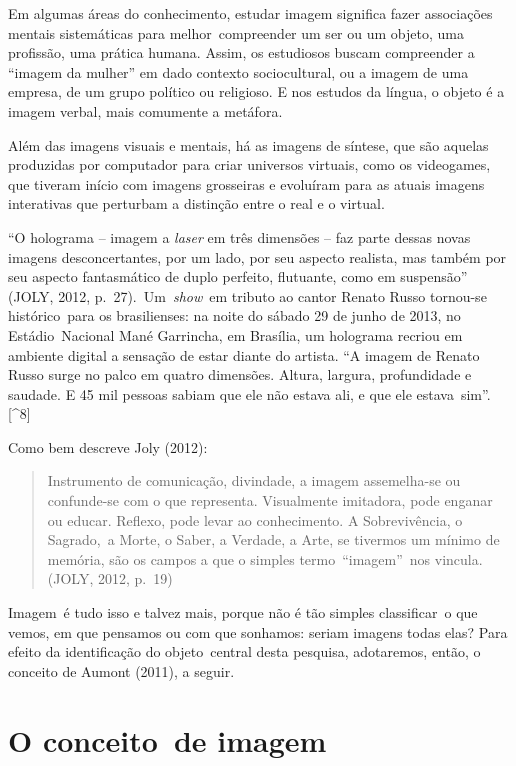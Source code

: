 \documentclass[
  letterpaper,
]{abntex2}
\begin{document}
Em algumas áreas do conhecimento, estudar imagem significa fazer
associações mentais sistemáticas para melhor~compreender um ser ou um
objeto, uma profissão, uma prática humana. Assim, os estudiosos buscam
compreender a ``imagem da mulher'' em dado contexto sociocultural, ou a
imagem de uma empresa, de um grupo político ou religioso. E nos estudos
da língua, o objeto é a imagem verbal, mais comumente a metáfora.~

Além das imagens visuais e mentais, há as imagens de síntese, que são
aquelas produzidas por computador para criar universos virtuais, como os
videogames, que tiveram início com imagens grosseiras e evoluíram para
as atuais imagens interativas que perturbam a distinção entre o real e o
virtual.

``O holograma -- imagem a \emph{laser} em três dimensões -- faz parte
dessas novas imagens desconcertantes, por um lado, por seu aspecto
realista, mas também por seu aspecto fantasmático de duplo perfeito,
flutuante, como em suspensão'' (JOLY, 2012, p.~27).~Um~\emph{show}~em
tributo ao cantor Renato Russo tornou-se histórico~para os brasilienses:
na noite do sábado 29 de junho de 2013, no Estádio~Nacional Mané
Garrincha, em Brasília, um holograma recriou em ambiente digital a
sensação de estar diante do artista. ``A imagem de Renato Russo surge no
palco em quatro dimensões. Altura, largura, profundidade e saudade. E 45
mil pessoas sabiam que ele não estava ali, e que ele
estava~sim''.{[}\^{}8{]}

Como bem descreve Joly (2012):~

\begin{quote}
Instrumento de comunicação, divindade, a imagem assemelha-se ou
confunde-se com o que representa. Visualmente imitadora, pode enganar ou
educar. Reflexo, pode levar ao conhecimento. A Sobrevivência, o
Sagrado,~a Morte, o Saber, a Verdade, a Arte, se tivermos um mínimo de
memória, são os campos a que o simples termo~``imagem''~nos vincula.
(JOLY, 2012, p.~19)~ ~
\end{quote}

Imagem~é tudo isso e talvez mais, porque não é tão simples classificar~o
que vemos, em que pensamos ou com que sonhamos: seriam imagens todas
elas? Para efeito da identificação do objeto~central desta pesquisa,
adotaremos, então, o conceito de Aumont (2011), a seguir. ~

\hypertarget{o-conceito-de-imagem}{%
\section{O conceito~de imagem}\label{o-conceito-de-imagem}}
\end{document}
